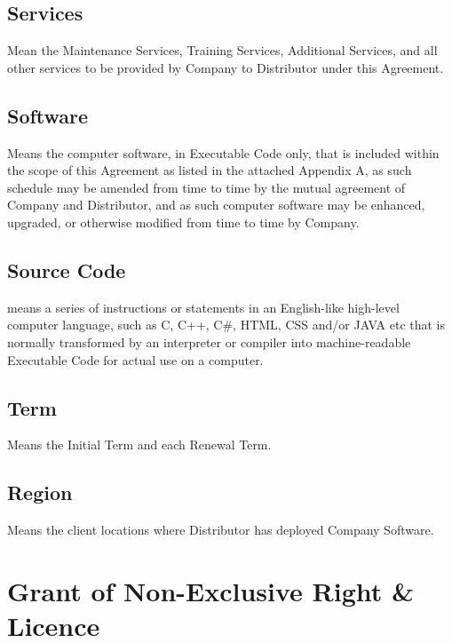 \documentclass[letterpaper,10pt,english]{sphinxmanual}
\begin{document}
\subsection{Services}
\label{\detokenize{definitions:services}}
Mean the Maintenance Services, Training Services, Additional Services, and all other services to be provided by Company to Distributor under this Agreement.


\subsection{Software}
\label{\detokenize{definitions:software}}
Means the computer software, in Executable Code only, that is included within the scope of this Agreement as listed in the attached Appendix A, as such schedule may be amended from time to time by the mutual agreement of Company and Distributor, and as such computer software may be enhanced, upgraded, or otherwise modified from time to time by Company.


\subsection{Source Code}
\label{\detokenize{definitions:source-code}}
means a series of instructions or statements in an English-like high-level computer language, such as C, C++, C\#, HTML, CSS and/or JAVA etc that is normally transformed by an interpreter or compiler into machine-readable Executable Code for actual use on a computer.


\subsection{Term}
\label{\detokenize{definitions:term}}
Means the Initial Term and each Renewal Term.


\subsection{Region}
\label{\detokenize{definitions:region}}
Means the client locations where Distributor has deployed Company Software.


\section{Grant of Non-Exclusive Right \& Licence}
\label{\detokenize{grantlicence:grant-of-non-exclusive-right-licence}}\label{\detokenize{grantlicence::doc}}
\end{document}
